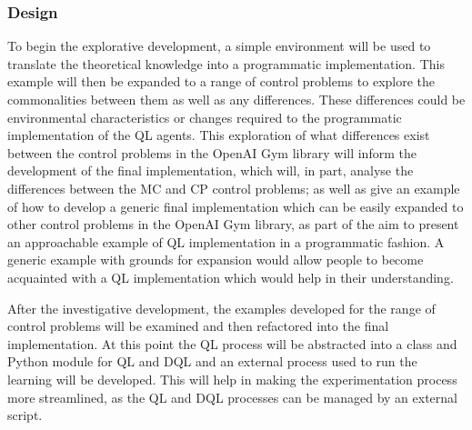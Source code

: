 \documentclass[hidelinks,journal]{IEEEtran}
\begin{document}
\subsubsection{Design}
\label{subsubsec:desArteDevDes}
To begin the explorative development, a simple environment will be used to translate the theoretical knowledge into a programmatic implementation. This example will then be expanded to a range of control problems to explore the commonalities between them as well as any differences. These differences could be environmental characteristics or changes required to the programmatic implementation of the QL agents. This exploration of what differences exist between the control problems in the OpenAI Gym library will inform the development of the final implementation, which will, in part, analyse the differences between the MC and CP control problems; as well as give an example of how to develop a generic final implementation which can be easily expanded to other control problems in the OpenAI Gym library, as part of the aim to present an approachable example of QL implementation in a programmatic fashion. A generic example with grounds for expansion would allow people to become acquainted with a QL implementation which would help in their understanding.

After the investigative development, the examples developed for the range of control problems will be examined and then refactored into the final implementation. At this point the QL process will be abstracted into a class and Python module for QL and DQL and an external process used to run the learning will be developed. This will help in making the experimentation process more streamlined, as the QL and DQL processes can be managed by an external script.
\end{document}
